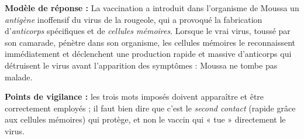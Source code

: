 \documentclass[11pt]{article}
\begin{document}
\begin{corrige}
\textbf{Modèle de réponse :} La vaccination a introduit dans l'organisme de Moussa un \emph{antigène} inoffensif du virus de la rougeole, qui a provoqué la fabrication d'\emph{anticorps} spécifiques et de \emph{cellules mémoires}. Lorsque le vrai virus, toussé par son camarade, pénètre dans son organisme, les cellules mémoires le reconnaissent immédiatement et déclenchent une production rapide et massive d'anticorps qui détruisent le virus avant l'apparition des symptômes : Moussa ne tombe pas malade.

\textbf{Points de vigilance :} les trois mots imposés doivent apparaître et être correctement employés ; il faut bien dire que c'est le \emph{second contact} (rapide grâce aux cellules mémoires) qui protège, et non le vaccin qui « tue » directement le virus.
\end{corrige}
\end{document}
